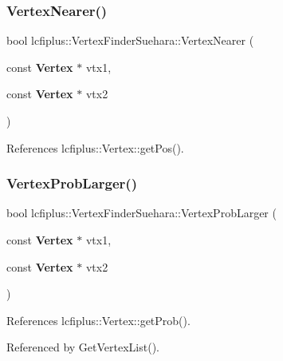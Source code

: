 \mbox{\label{namespacelcfiplus_1_1VertexFinderSuehara_ab63633a6b9d2e03ba72331686e5857dd}} 
\subsubsection{Vertex\+Nearer()}
{\footnotesize\ttfamily bool lcfiplus\+::\+Vertex\+Finder\+Suehara\+::\+Vertex\+Nearer (\begin{DoxyParamCaption}\item[{const \textbf{ Vertex} $\ast$}]{vtx1,  }\item[{const \textbf{ Vertex} $\ast$}]{vtx2 }\end{DoxyParamCaption})}



References lcfiplus\+::\+Vertex\+::get\+Pos().

\mbox{\label{namespacelcfiplus_1_1VertexFinderSuehara_a390fa0c9aa8110066c3490bf1c919414}} 
\subsubsection{Vertex\+Prob\+Larger()}
{\footnotesize\ttfamily bool lcfiplus\+::\+Vertex\+Finder\+Suehara\+::\+Vertex\+Prob\+Larger (\begin{DoxyParamCaption}\item[{const \textbf{ Vertex} $\ast$}]{vtx1,  }\item[{const \textbf{ Vertex} $\ast$}]{vtx2 }\end{DoxyParamCaption})}



References lcfiplus\+::\+Vertex\+::get\+Prob().



Referenced by Get\+Vertex\+List().

